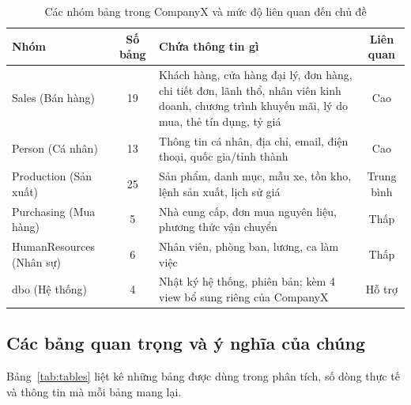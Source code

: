 \begin{table}[H]
\centering
\caption{Các nhóm bảng trong CompanyX và mức độ liên quan đến chủ đề}
\label{tab:schemas}
\small
\begin{tabularx}{\textwidth}{l c X c}
\toprule
\rowcolor{tblhead} \textbf{Nhóm} & \textbf{Số bảng} & \textbf{Chứa thông tin gì} & \textbf{Liên quan} \\
\midrule
Sales (Bán hàng) & 19 & Khách hàng, cửa hàng đại lý, đơn hàng, chi tiết đơn, lãnh thổ, nhân viên kinh doanh, chương trình khuyến mãi, lý do mua, thẻ tín dụng, tỷ giá & Cao \\
Person (Cá nhân) & 13 & Thông tin cá nhân, địa chỉ, email, điện thoại, quốc gia/tỉnh thành & Cao \\
Production (Sản xuất) & 25 & Sản phẩm, danh mục, mẫu xe, tồn kho, lệnh sản xuất, lịch sử giá & Trung bình \\
Purchasing (Mua hàng) & 5 & Nhà cung cấp, đơn mua nguyên liệu, phương thức vận chuyển & Thấp \\
HumanResources (Nhân sự) & 6 & Nhân viên, phòng ban, lương, ca làm việc & Thấp \\
dbo (Hệ thống) & 4 & Nhật ký hệ thống, phiên bản; kèm 4 view bổ sung riêng của CompanyX & Hỗ trợ \\
\bottomrule
\end{tabularx}
\end{table}

\subsection{Các bảng quan trọng và ý nghĩa của chúng}
Bảng~\ref{tab:tables} liệt kê những bảng được dùng trong phân tích, số dòng thực tế và thông tin mà mỗi bảng mang lại.

